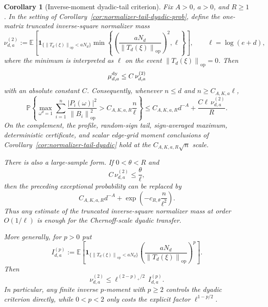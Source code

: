 \documentclass[11pt]{amsart}
\numberwithin{equation}{section}
\newtheorem{corollary}[theorem]{Corollary}
\theoremstyle{definition}
\theoremstyle{remark}
\newcommand{\op}{\mathrm{op}}
\newcommand{\Prob}{\mathbb P}
\newcommand{\Exp}{\mathbb E}
\newcommand{\norm}[1]{\left\lVert #1\right\rVert}
\newcommand{\abs}[1]{\left\lvert #1\right\rvert}
\begin{document}
\begin{corollary}[Inverse-moment dyadic-tail criterion]
\label{cor:normalizer-tail-invmoment}
Fix \(A>0\), \(a>0\), and \(R\ge1\).  In the setting of
Corollary~\ref{cor:normalizer-tail-dyadic-prob}, define the one-matrix
truncated inverse-square normalizer mass
\[
  \nu_{d,a}^{(2)}
  :=
  \Exp\left[
  \mathbf 1_{\{\norm{T_d(\xi)}_{\op}<aN_d\}}
  \min\left\{
  \left(\frac{aN_d}{\norm{T_d(\xi)}_{\op}}\right)^2,\ell
  \right\}
  \right],
  \qquad \ell=\log(e+d),
\]
where the minimum is interpreted as \(\ell\) on the event
\(\norm{T_d(\xi)}_{\op}=0\).  Then
\[
  \mu_{d,a}^{\rm dy}\le C\,\nu_{d,a}^{(2)}
\]
with an absolute constant \(C\).  Consequently, whenever \(n\le d\) and
\(n\ge C_{A,K,a}\ell\),
\[
  \Prob\left\{
  \max_{\omega^d=1}
  \sum_{i=1}^n
  \frac{\abs{P_i(\omega)}^2}{\norm{B_i}_{\op}^2}
  > C_{A,K,a,R}\frac n\ell
  \right\}
  \le
  C_{A,K,a,R}d^{-A}
  +\frac{C\ell\,\nu_{d,a}^{(2)}}{R}.
\]
On the complement, the profile, random-sign tail, sign-averaged maximum,
deterministic certificate, and scalar edge-grid moment conclusions of
Corollary~\ref{cor:normalizer-tail-dyadic} hold at the
\(C_{A,K,a,R}\sqrt n\) scale.

There is also a large-sample form.  If \(0<\theta<R\) and
\[
  C\,\nu_{d,a}^{(2)}\le \frac{\theta}{\ell},
\]
then the preceding exceptional probability can be replaced by
\[
  C_{A,K,a,R}d^{-A}
  +\exp\left(-c_{R,\theta}\frac n{\ell^2}\right).
\]
Thus any estimate of the truncated inverse-square normalizer mass at order
\(O(1/\ell)\) is enough for the Chernoff-scale dyadic transfer.

More generally, for \(p>0\) put
\[
  I_{d,a}^{(p)}
  :=
  \Exp\left[
  \mathbf 1_{\{\norm{T_d(\xi)}_{\op}<aN_d\}}
  \left(\frac{aN_d}{\norm{T_d(\xi)}_{\op}}\right)^p
  \right].
\]
Then
\[
  \nu_{d,a}^{(2)}
  \le
  \ell^{(2-p)_+/2}\,I_{d,a}^{(p)}.
\]
In particular, any finite inverse \(p\)-moment with \(p\ge2\) controls the
dyadic criterion directly, while \(0<p<2\) only costs the explicit factor
\(\ell^{1-p/2}\).
\end{corollary}
\end{document}
